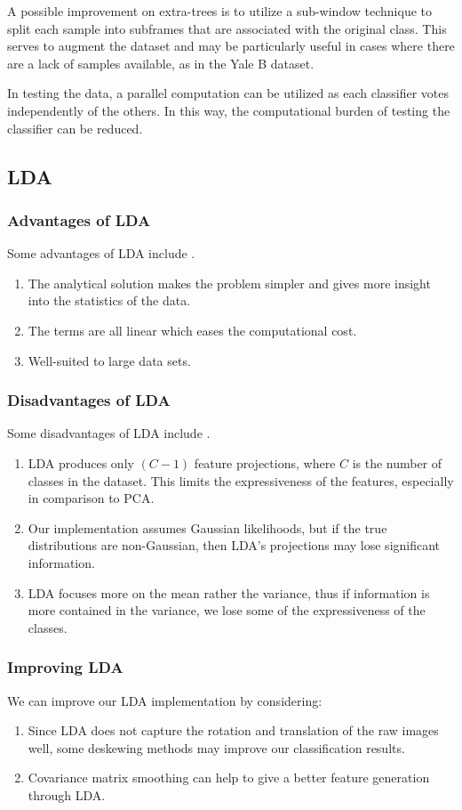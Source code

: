 A possible improvement on extra-trees is to utilize a sub-window technique to split each sample into subframes that are associated with the original class. This serves to augment the dataset and may be particularly useful in cases where there are a lack of samples available, as in the Yale B dataset.

In testing the data, a parallel computation can be utilized as each classifier votes independently of the others. In this way, the computational burden of testing the classifier can be reduced.

\subsection{LDA}
\subsubsection{Advantages of LDA}
Some advantages of LDA include \cite{book:advlda}.
%
\begin{enumerate}
	\item The analytical solution makes the problem simpler and gives more insight into the statistics of the data.
	\item The terms are all linear which eases the computational cost.
	\item Well-suited to large data sets.
\end{enumerate}

\subsubsection{Disadvantages of LDA}

Some disadvantages of LDA include \cite{notes:dislda}.
%
\begin{enumerate}
	\item LDA produces only $(C-1)$ feature projections, where $C$ is the number of classes in the dataset. This limits the expressiveness of the features, especially in comparison to PCA. 
	\item Our implementation assumes Gaussian likelihoods, but if the true distributions are non-Gaussian, then LDA's projections may lose significant information.
	\item LDA focuses more on the mean rather the variance, thus if information is more contained in the variance, we lose some of the expressiveness of the classes.
\end{enumerate}

\subsubsection{Improving LDA}

We can improve our LDA implementation by considering:
\begin{enumerate}
	\item Since LDA does not capture the rotation and translation of the raw images well, some deskewing methods may improve our classification results.
	\item Covariance matrix smoothing can help to give a better feature generation through LDA. 
\end{enumerate}
